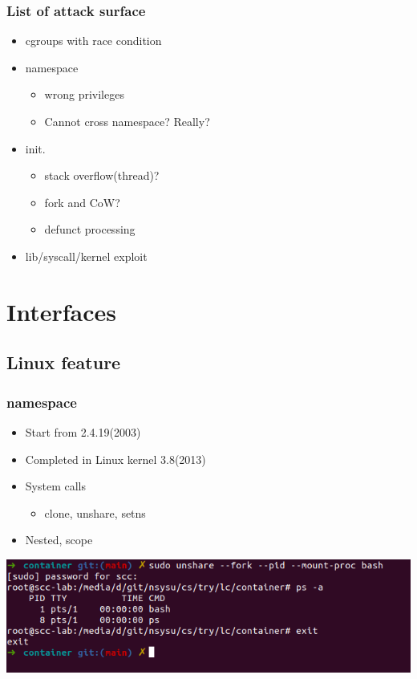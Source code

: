\documentclass{beamer}
\begin{document}
\begin{frame}
    \frametitle{List of attack surface}
    \begin{itemize}
        \item cgroups with race condition
        \item namespace
              \begin{itemize}
                  \item wrong privileges
                  \item Cannot cross namespace? Really?
              \end{itemize}
        \item init.
              \begin{itemize}
                  \item stack overflow(thread)?
                  \item fork and CoW?
                  \item defunct processing
              \end{itemize}
        \item lib/syscall/kernel exploit
    \end{itemize}
\end{frame}


\section{Interfaces}
\subsection{Linux feature}
\begin{frame}
    \frametitle{namespace}
    \begin{itemize}
        \item Start from 2.4.19(2003)
        \item Completed in Linux kernel 3.8(2013)
        \item System calls
              \begin{itemize}
                  \item clone, unshare, setns
              \end{itemize}
        \item Nested, scope
    \end{itemize}
    \includegraphics[width=\textwidth]{unshare_cmd.png}
\end{frame}
\end{document}
